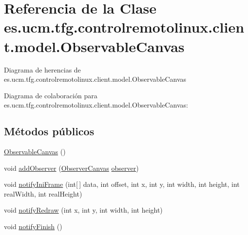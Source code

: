 \hypertarget{classes_1_1ucm_1_1tfg_1_1controlremotolinux_1_1client_1_1model_1_1ObservableCanvas}{\section{Referencia de la Clase es.\-ucm.\-tfg.\-controlremotolinux.\-client.\-model.\-Observable\-Canvas}
\label{classes_1_1ucm_1_1tfg_1_1controlremotolinux_1_1client_1_1model_1_1ObservableCanvas}
}


Diagrama de herencias de es.\-ucm.\-tfg.\-controlremotolinux.\-client.\-model.\-Observable\-Canvas


Diagrama de colaboración para es.\-ucm.\-tfg.\-controlremotolinux.\-client.\-model.\-Observable\-Canvas\-:
\subsection*{Métodos públicos}
\begin{DoxyCompactItemize}
\item 
\hyperlink{classes_1_1ucm_1_1tfg_1_1controlremotolinux_1_1client_1_1model_1_1ObservableCanvas_ad4d780d0c040b56f837d9d42b0999b21}{Observable\-Canvas} ()
\item 
void \hyperlink{classes_1_1ucm_1_1tfg_1_1controlremotolinux_1_1client_1_1model_1_1ObservableCanvas_af0b5f3dcc7000e46b4132a5284b65578}{add\-Observer} (\hyperlink{interfacees_1_1ucm_1_1tfg_1_1controlremotolinux_1_1client_1_1model_1_1ObserverCanvas}{Observer\-Canvas} \hyperlink{classes_1_1ucm_1_1tfg_1_1controlremotolinux_1_1client_1_1model_1_1ObservableCanvas_a04d29b541c5c02544c43d955b113c3c8}{observer})
\item 
void \hyperlink{classes_1_1ucm_1_1tfg_1_1controlremotolinux_1_1client_1_1model_1_1ObservableCanvas_aad148df17de69cd6a66de7694d18a6a3}{notify\-Ini\-Frame} (int\mbox{[}$\,$\mbox{]} data, int offset, int x, int y, int width, int height, int real\-Width, int real\-Height)
\item 
void \hyperlink{classes_1_1ucm_1_1tfg_1_1controlremotolinux_1_1client_1_1model_1_1ObservableCanvas_a5f65bfb632cfb67f0a544d2cfd706a33}{notify\-Redraw} (int x, int y, int width, int height)
\item 
void \hyperlink{classes_1_1ucm_1_1tfg_1_1controlremotolinux_1_1client_1_1model_1_1ObservableCanvas_adafb3e933c04a4ffcac40acd1a58415b}{notify\-Finish} ()
\end{DoxyCompactItemize}
